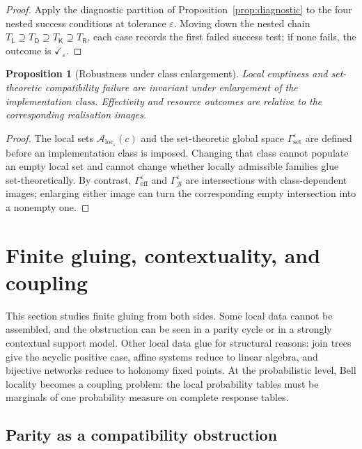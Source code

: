 \documentclass[11pt]{article}
\theoremstyle{plain}
\newtheorem{proposition}[theorem]{Proposition}
\theoremstyle{definition}
\theoremstyle{remark}
\newcommand{\LocalAdm}{\mathcal{A}_{\mathrm{loc}}}
\newcommand{\eps}{\varepsilon}
\begin{document}
\begin{proof}
Apply the diagnostic partition of Proposition~\ref{prop:diagnostic} to the four
nested success conditions at tolerance $\eps$. Moving down the nested chain
$T_{\mathsf L}\supseteq T_{\mathsf D}\supseteq T_{\mathsf K}\supseteq
T_{\mathsf R}$, each case records the first failed success test; if none fails,
the outcome is $\checkmark_\eps$.
\end{proof}

\begin{proposition}[Robustness under class enlargement]\label{prop:robust}
Local emptiness and set-theoretic compatibility failure are invariant under
enlargement of the implementation class. Effectivity and resource outcomes are
relative to the corresponding realisation images.
\end{proposition}

\begin{proof}
The local sets $\LocalAdm_\eps(c)$ and the set-theoretic global space
$\Gamma_{\mathrm{set}}^\eps$ are defined before an implementation class is
imposed. Changing that class cannot populate an empty local set and cannot change
whether locally admissible families glue set-theoretically. By contrast,
$\Gamma_{\mathrm{eff}}^\eps$ and $\Gamma_{\mathcal B}^\eps$ are intersections
with class-dependent images; enlarging either image can turn the corresponding
empty intersection into a nonempty one.
\end{proof}

\section{Finite gluing, contextuality, and coupling}\label{sec:Dtri}

This section studies finite gluing from both sides. Some local data cannot be
assembled, and the obstruction can be seen in a parity cycle or in a strongly
contextual support model. Other local data glue for structural reasons: join
trees give the acyclic positive case, affine systems reduce to linear algebra,
and bijective networks reduce to holonomy fixed points. At the probabilistic
level, Bell locality becomes a coupling problem: the local probability tables
must be marginals of one probability measure on complete response tables.

\subsection{Parity as a compatibility obstruction}
\end{document}
